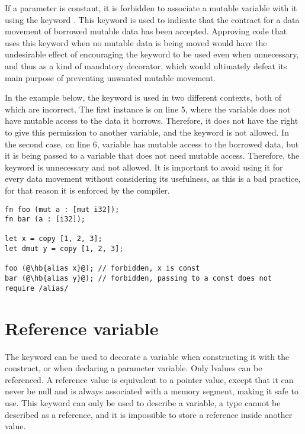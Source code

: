 If a parameter is constant, it is forbidden to associate a mutable variable with
it using the keyword . This keyword is used to indicate that the
contract for a data movement of borrowed mutable data has been accepted.
Approving code that uses this keyword when no mutable data is being moved would
have the undesirable effect of encouraging the keyword to be used even when
unnecessary, and thus as a kind of mandatory decorator, which would ultimately
defeat its main purpose of preventing unwanted mutable movement.

In the example below, the keyword  is used in two different
contexts, both of which are incorrect. The first instance is on line 5, where
the variable  does not have mutable access to the data it borrows.
Therefore, it does not have the right to give this permission to another
variable, and the keyword  is not allowed. In the second case, on
line 6, variable  has mutable access to the borrowed data, but it is
being passed to a variable that does not need mutable access. Therefore, the
keyword is unnecessary and not allowed. It is important to avoid using it for
every data movement without considering its usefulness, as this is a bad
practice, for that reason it is enforced by the compiler.

\begin{lstlisting}[style=coloredverbatim, escapechar=@]
fn foo (mut a : [mut i32]);
fn bar (a : [i32]);

let x = copy [1, 2, 3];
let dmut y = copy [1, 2, 3];

foo (@\hb{alias x}@); // forbidden, x is const
bar (@\hb{alias y}@); // forbidden, passing to a const does not require /alias/
\end{lstlisting}

\vfill%
\pagebreak

\section {Reference variable}
\label{sec:ref_variable}

The  keyword can be used to decorate a variable when constructing it
with the  construct, or when declaring a parameter variable. Only
lvalues can be referenced. A reference value is equivalent to a pointer value,
except that it can never be null and is always associated with a memory segment,
making it safe to use. This keyword can only be used to describe a variable, a
type cannot be described as a reference, and it is impossible to store a
reference inside another value.

